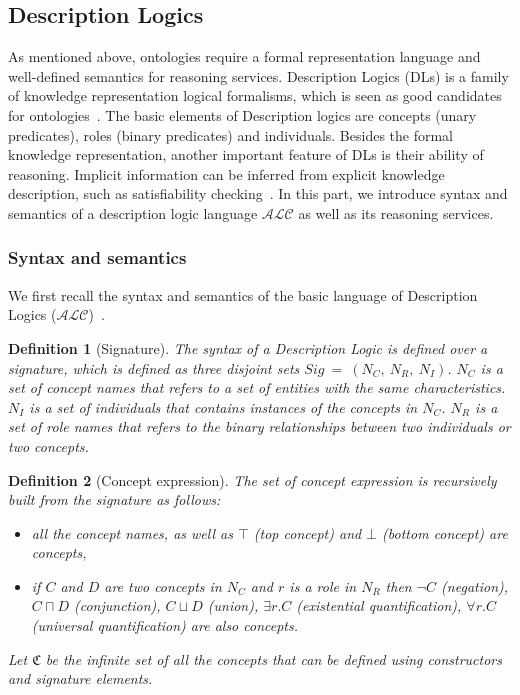 \documentclass{article}
\newtheorem{mydef}{Definition}
\begin{document}
\subsection{Description Logics}
As mentioned above, ontologies require a formal representation language and well-defined semantics for reasoning services. 
Description Logics (DLs) is a family of knowledge representation logical formalisms, which is seen as good candidates for ontologies~\cite{horrocks1999description}.
The basic elements of Description logics are concepts (unary predicates), roles (binary predicates) and individuals.
Besides the formal knowledge representation, another important feature of DLs is their ability of reasoning.
Implicit information can be inferred from explicit knowledge description, such as satisfiability checking~\cite{baader2003description}. 
In this part, we introduce syntax and semantics of a description logic language $\mathcal{ALC}$ as well as its reasoning services.
\subsubsection{Syntax and semantics}
We first recall the syntax and semantics of the basic language of Description Logics ($\mathcal{ALC}$)~\cite{baader2003description}.
\begin{mydef}[Signature]
 The syntax of a Description Logic is defined over a signature, which is defined as three disjoint sets $Sig~=~(N_C,~N_R,~N_I)$. $N_C$ is a set of concept names that refers to a set of entities
 with the same characteristics. $N_I$ is a set of individuals that contains instances of the concepts in $N_C$.  $N_R$ is a set of role names that refers to the binary relationships between 
 two individuals or two concepts.
\end{mydef}


\begin{mydef}[Concept expression]
 The set of concept expression is recursively built from the signature as follows:
 \begin{itemize}
  \item all the concept names, as well as $\top$ (top concept) and $\bot$ (bottom concept) are concepts,
  \item if $C$ and $D$ are two concepts in $N_C$ and $r$ is a role in $N_R$
  then $\neg C$ (negation), $ C\sqcap D$ (conjunction), $ C\sqcup D$ (union), $ \exists r.C$ (existential quantification), $\forall r.C$ (universal quantification) are also concepts.
 \end{itemize}
 Let $\mathfrak{C}$ be the infinite set of all the concepts that can be defined using constructors and signature elements.
\end{mydef}
\end{document}
